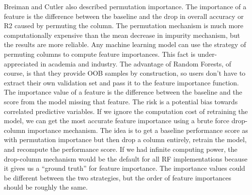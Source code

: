 \documentclass[preprint,12pt]{elsarticle}
\begin{document}
Breiman and Cutler also described permutation importance. The importance of a feature is the difference between the baseline and the drop in overall accuracy or R2 caused by permuting the column. The permutation mechanism is much more computationally expensive than the mean decrease in impurity mechanism, but the results are more reliable.
Any machine learning model can use the strategy of permuting columns to compute feature importances. 
This fact is under-appreciated in academia and industry. 
The advantage of Random Forests, of course, is that they provide OOB samples by construction, so users don't have to extract their own validation set and pass it to the feature importance function. 
The importance value of a feature is the difference between the baseline and the score from the model missing that feature. 
The risk is a potential bias towards correlated predictive variables. 
If we ignore the computation cost of retraining the model, we can get the most accurate feature importance using a brute force drop-column importance mechanism. The idea is to get a baseline performance score as with permutation importance but then drop a column entirely, retrain the model, and recompute the performance score. If we had infinite computing power, the drop-column mechanism would be the default for all RF implementations because it gives us a “ground truth” for feature importance. The importance values could be different between the two strategies, but the order of feature importances should be roughly the same. 
\end{document}
